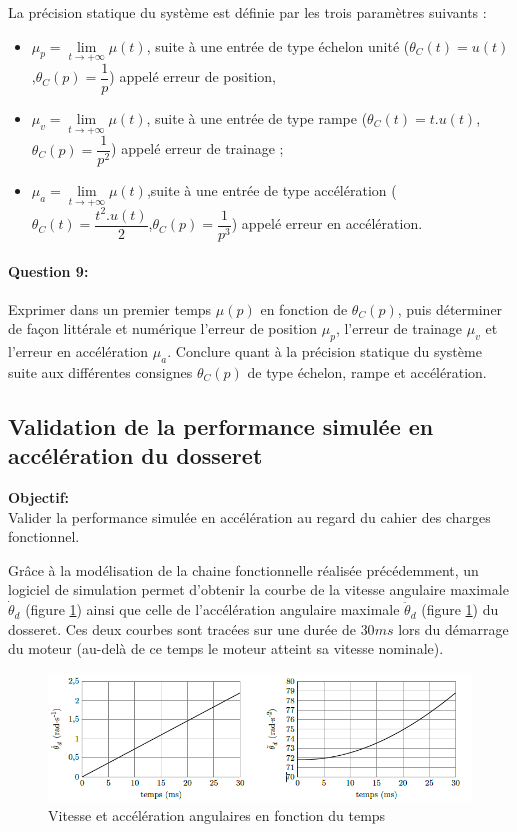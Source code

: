 La précision statique du système est définie par les trois paramètres suivants :
\begin{itemize}
 \item $\mu_p=\lim\limits_{t \rightarrow +\infty} \mu(t)$, suite à une entrée de type échelon unité ($\theta_C(t)=u(t)$,$\theta_C(p)=\dfrac{1}{p}$) appelé erreur de position,
 \item $\mu_v=\lim\limits_{t \rightarrow +\infty} \mu(t)$, suite à une entrée de type rampe ($\theta_C(t)=t.u(t)$,$\theta_C(p)=\dfrac{1}{p^2}$) appelé erreur de trainage ;
 \item $\mu_a=\lim\limits_{t \rightarrow +\infty} \mu(t)$,suite à une entrée de type accélération ($\theta_C(t)=\dfrac{t^2.u(t)}{2}$,$\theta_C(p)=\dfrac{1}{p^3}$) appelé erreur en accélération.
\end{itemize}

\paragraph{Question 9:} Exprimer dans un premier temps $\mu(p)$ en fonction de $\theta_C(p)$, puis déterminer de façon littérale et numérique l'erreur de position $\mu_p$, l'erreur de trainage $\mu_v$ et l'erreur en accélération $\mu_a$. Conclure quant à la précision statique du système suite aux différentes consignes $\theta_C(p)$ de type échelon, rampe et accélération.

\subsection{Validation de la performance simulée en accélération du dosseret}

\textbf{Objectif:}\\
Valider la performance simulée en accélération au regard du cahier des charges fonctionnel.

Grâce à la modélisation de la chaine fonctionnelle réalisée précédemment, un logiciel de simulation permet d'obtenir la courbe de la vitesse angulaire maximale $\dot{\theta}_d$ (figure \ref{fig15}) ainsi que celle de l'accélération angulaire maximale $\ddot{\theta}_d$ (figure \ref{fig15}) du dosseret. Ces deux courbes sont tracées sur une durée de $30ms$ lors du démarrage du moteur (au-delà de ce temps le moteur atteint sa vitesse nominale).

\begin{figure}[!ht]
\begin{center}
 \includegraphics[width=0.9\linewidth]{img/img16}
\end{center}
\caption{Vitesse et accélération angulaires en fonction du temps}
\label{fig15}
\end{figure}

